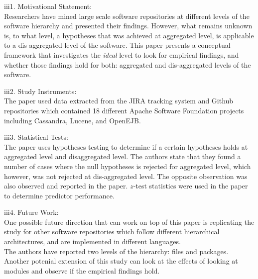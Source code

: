 \documentclass[12pt]{article}
\begin{document}
\begin{itemize}
\begin{item}
iii1. Motivational Statement: \\
Researchers have mined large scale software repositories at different levels 
of the software hierarchy and presented their findings. However, what remains 
unknown is, to what level, a hypotheses that was achieved at aggregated level, is 
applicable to a dis-aggregated level of the software. This paper presents a conceptual 
framework that investigates the \textit{ideal} level 
to look for empirical findings, and whether those findings hold for both: aggregated 
and dis-aggregated levels of the software.    
\end{item}
\begin{item}
iii2. Study Instruments: \\
The paper used data extracted from the JIRA tracking system and Github repositories 
which contained 18 different Apache Software Foundation projects including Cassandra,  
Lucene, and OpenEJB. 

\end{item}
\begin{item}
iii3. Statistical Tests: \\
The paper uses hypotheses testing to determine if a certain hypotheses 
holds at aggregated level and disaggregated level. The authors state that  
they found a number of cases where the null hypotheses is rejected 
for aggregated level, which however, was not rejected at dis-aggregated level. 
The opposite observation was also observed and reported in the paper.  $z$-test 
statistics were used in the paper to determine predictor performance.

\end{item}
\begin{item}
iii4. Future Work: \\
One possible future direction that can work on top of  this 
paper is replicating the study for other software repositories 
which follow different hierarchical architectures, and are implemented 
in different languages. \\ 
The authors have reported two levels of the hierarchy: files and packages. 
Another potenial extension of this study can look at the effects of looking 
at modules and observe if the empirical findings hold. \\

\end{item}
\end{itemize} 
\end{document}
